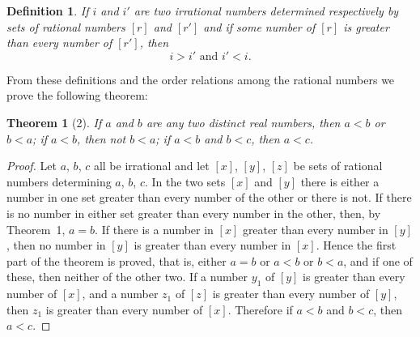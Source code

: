 \documentclass[a4paper,12pt]{book}[2004/02/16]
\providecommand{\hyperlink}[2]{#2}
\providecommand{\hypertarget}[2]{#2}
\theoremstyle{ilemma}
\theoremstyle{itheorem}
\newtheorem{theorem}{Theorem}
\theoremstyle{iother}
\theoremstyle{icorollary}
\theoremstyle{numcorollary}
\theoremstyle{idefinition}
\newtheorem*{definition}{Definition}
\begin{document}
\begin{definition}
If $i$ and $i'$ are two irrational numbers determined
respectively by sets of rational numbers $[r]$ and $[r']$
and if some number of $[r]$ is greater than every number of $[r']$,
then
\[
  i>i' \text{ and } i'<i.
\]
\end{definition}
From these definitions and the order relations among the
rational numbers we prove the following theorem:
\begin{theorem}[2]\hypertarget{thm2}{}
If $a$ and $b$ are any two distinct real numbers, then $a<b$ or $b<a$;
if $a<b$, then not $b<a$; if $a<b$ and $b<c$, then $a<c$.
\end{theorem}
\begin{proof}
Let $a$, $b$, $c$ all be irrational and let $[x]$, $[y]$, $[z]$ be
sets of rational numbers determining $a$, $b$, $c$. In the two sets
$[x]$ and $[y]$ there is either a number in one set greater than every
number of the other or there is not. If there is no number in either
set greater than every number in the other, then, by Theorem~\hyperlink{thm1}{1},
$a=b$. If there is a number in $[x]$ greater than every number in
$[y]$, then no number in $[y]$ is greater than every number in
$[x]$. Hence the first part of the theorem is
proved, that is, either $a=b$ or $a<b$ or $b<a$, and if one of these,
then neither of the other two. If a number $y_1$ of $[y]$ is greater
than every number of $[x]$, and a number $z_1$ of $[z]$ is greater
than every number of $[y]$, then $z_1$ is greater than every number
of $[x]$. Therefore if $a<b$ and $b<c$, then $a<c$.
\end{proof}
\end{document}
